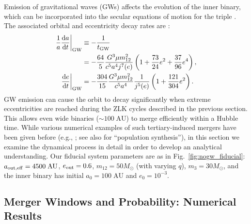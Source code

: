 \documentclass[
        fleqn,
        usenatbib,
    ]{mnras}
\newcommand*{\rd}[2]{\frac{\mathrm{d}#1}{\mathrm{d}#2}}
\newcommand*{\at}[1]{\left.#1\right|}
\newcommand*{\p}[1]{\left(#1\right)}
\begin{document}
Emission of gravitational waves (GWs) affects the evolution of the inner
binary, which can be incorporated into the secular equations of motion for the
triple \citep[e.g.,]{peters1964, LL18}. The associated orbital and eccentricity
decay rates are \citep{peters1964}:
\begin{align}
    \at{\frac{1}{a}\rd{a}{t}}_{\rm GW} &\equiv -\frac{1}{t_{\rm GW}}\nonumber\\
        &= -\frac{64}{5}\frac{G^3 \mu m_{12}^2}{c^5a^4j^7(e)}
            \p{1 + \frac{73}{24}e^2 + \frac{37}{96}e^4}\label{eq:def_tgw},\\
    \at{\rd{e}{t}}_{\rm GW} &= -\frac{304}{15}\frac{G^3 \mu m_{12}^2}{c^5a^4}
        \frac{1}{j^{5}(e)}\p{1 + \frac{121}{304}e^2}\label{eq:dedt_gw}.
\end{align}
GW emission can cause the orbit to decay significantly when extreme
eccentricities are reached during the ZLK cycles described in the previous
section. This allows even wide binaries ($\sim 100\;\mathrm{AU}$) to merge
efficiently within a Hubble time. While various numerical examples of such
tertiary-induced mergers have been given before (e.g., \citet{LL18}; see also
\citet{LL19} for ``population synthesis''), in this section we examine the
dynamical process in detail in order to develop an analytical understanding. Our
fiducial system parameters are as in Fig.~\ref{fig:nogw_fiducial}: $a_{\rm out,
eff} = 4500\;\mathrm{AU}$, $e_{\rm out} = 0.6$, $m_{12} = 50M_{\odot}$ (with
varying $q$), $m_3 = 30M_{\odot}$, and the inner binary has initial $a_0 =
100\;\mathrm{AU}$ and $e_0 = 10^{-3}$.

\subsection{Merger Windows and Probability: Numerical Results}\label{ss:windows}
\end{document}

